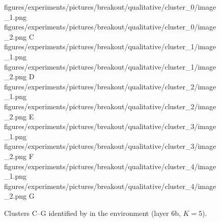 \begin{figure}[H]
    \qualitativeClusterFigureSetup
    \qualitativeClusterTwo
        {figures/experiments/pictures/breakout/qualitative/cluster_0/image_1.png}
        {figures/experiments/pictures/breakout/qualitative/cluster_0/image_2.png}
        {C}
    \qualitativeClusterTwo
        {figures/experiments/pictures/breakout/qualitative/cluster_1/image_1.png}
        {figures/experiments/pictures/breakout/qualitative/cluster_1/image_2.png}
        {D}
    \qualitativeClusterTwo
        {figures/experiments/pictures/breakout/qualitative/cluster_2/image_1.png}
        {figures/experiments/pictures/breakout/qualitative/cluster_2/image_2.png}
        {E}
    \qualitativeClusterTwo
        {figures/experiments/pictures/breakout/qualitative/cluster_3/image_1.png}
        {figures/experiments/pictures/breakout/qualitative/cluster_3/image_2.png}
        {F}
    \qualitativeClusterTwo
        {figures/experiments/pictures/breakout/qualitative/cluster_4/image_1.png}
        {figures/experiments/pictures/breakout/qualitative/cluster_4/image_2.png}
        {G}
    \caption{Clusters C--G identified by  in the \BreakoutName environment (layer 6b, $K=5$).}
    \label{fig:qualitative_breakout}
\end{figure}
